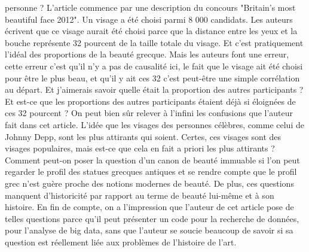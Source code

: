 \documentclass[a4paper, twoside, 12pt]{book}
\begin{document}
personne ? L'article commence par une description du concours "Britain's most beautiful face 2012". Un visage a été choisi parmi 8 000 candidats. Les auteurs écrivent que ce visage aurait été choisi parce que la distance entre les yeux et la bouche représente 32 pourcent de la taille totale du visage. Et c'est pratiquement l'idéal des proportions de la beauté grecque. Mais les auteurs font une erreur, cette erreur c'est qu'il n'y a pas de causalité ici, le fait que le visage ait été choisi pour être le plus beau, et qu'il y ait ces 32 c'est peut-être une simple corrélation au départ. Et j'aimerais savoir quelle était la proportion des autres participants ? Et est-ce que les proportions des autres participants étaient déjà si éloignées de ces 32 pourcent ? On peut bien sûr relever à l'infini les confusions que l'auteur fait dans cet article. L'idée que les visages des personnes célèbres, comme celui de Johnny Depp, sont les plus attirants qui soient. Certes, ces visages sont des visages populaires, mais est-ce que cela en fait a priori les plus attirants ? Comment peut-on poser la question d'un canon de beauté immuable si l'on peut regarder le profil des statues grecques antiques et se rendre compte que le profil grec n'est guère proche des notions modernes de beauté. De plus, ces questions manquent d'historicité par rapport au terme de beauté lui-même et à son histoire. En fin de compte, on a l'impression que l'auteur de cet article pose de telles questions parce qu'il peut présenter un code pour la recherche de données, pour l'analyse de big data, sans que l'auteur se soucie beaucoup de savoir si sa question est réellement liée aux problèmes de l'histoire de l'art.\\
\end{document}
